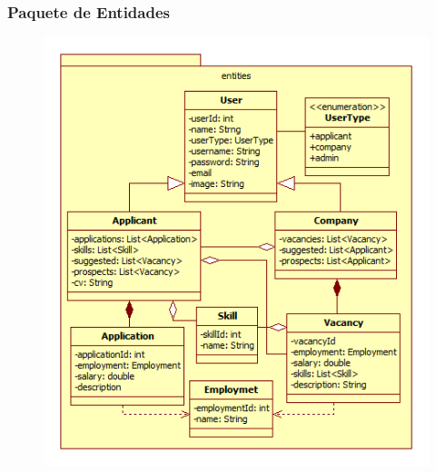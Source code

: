 \frame
{
  \frametitle{Paquete de Entidades}
  
	\begin{figure}[h]
	\begin{center}
	 	\includegraphics[scale=0.45]{./resources/EntitiesPackage.png} 
	\end{center}
	\end{figure}
}